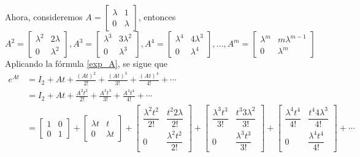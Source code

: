 \begin{example}
    Ahora, consideremos $A = \begin{bmatrix} \lambda & 1 \\ 0 & \lambda \end{bmatrix}$, entonces
    $$A^2 = \begin{bmatrix} \lambda^2 & 2\lambda \\ 0 & \lambda^2 \end{bmatrix}, A^3 = \begin{bmatrix} \lambda^3 & 3\lambda^2 \\ 0 & \lambda^3 \end{bmatrix}, A^4 = \begin{bmatrix} \lambda^4 & 4\lambda^3 \\ 0 & \lambda^4 \end{bmatrix}, \dots, A^m = \begin{bmatrix} \lambda^m & m\lambda^{m - 1} \\ 0 & \lambda^m \end{bmatrix}$$
    Aplicando la fórmula \eqref{exp_A}, se sigue que
    \begin{align*}
        e^{At} & = I_2 + At + \frac{(At)^2}{2!} + \frac{(At)^3}{3!} + \frac{(At)^4}{4!} + \cdots \\
        & = I_2 + At + \frac{A^2t^2}{2!} + \frac{A^3t^3}{3!} + \frac{A^4t^4}{4!} + \cdots \\
        & = \begin{bmatrix} 1 & 0 \\ 0 & 1 \end{bmatrix} + \begin{bmatrix} \lambda t & t \\ 0 & \lambda t \end{bmatrix} + \begin{bmatrix} \dfrac{\lambda^2 t^2}{2!} & \dfrac{t^2 2\lambda}{2!} \\[3mm] 0 & \dfrac{\lambda^2 t^2}{2!} \end{bmatrix} + \begin{bmatrix} \dfrac{\lambda^3 t^3}{3!} & \dfrac{t^3 3\lambda^2}{3!} \\[3mm] 0 & \dfrac{\lambda^3 t^3}{3!} \end{bmatrix} + \begin{bmatrix} \dfrac{\lambda^4 t^4}{4!} & \dfrac{t^4 4\lambda^3}{4!} \\[3mm] 0 & \dfrac{\lambda^4 t^4}{4!} \end{bmatrix} + \cdots \\

\end{align*}
\end{example}
